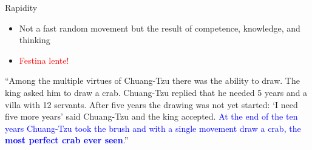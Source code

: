 \documentclass{beamer}
\begin{document}
\begin{frame}
{\centerline{Rapidity}}

\begin{itemize}
\item Not a fast random movement but the result of competence, knowledge, and thinking
\item \textcolor{red}{Festina lente!}
\end{itemize}
\vspace{0.2cm}
\begin{tcolorbox}[colback=yellow!5,colframe=yellow!40!black]
``Among the multiple virtues of Chuang-Tzu there was the ability to draw. The king asked him to draw a crab. Chuang-Tzu replied that he needed 5 years and a villa with 12 servants. After five years the drawing was not yet started: `I need five more years' said Chuang-Tzu and the king accepted. \textcolor{blue}{At the end of the ten years Chuang-Tzu took the brush and with a single movement draw a crab, the \textbf{most perfect crab ever seen}}.''
\end{tcolorbox}

\end{frame}
\end{document}
